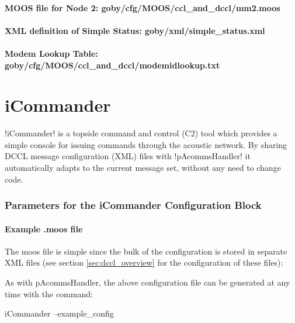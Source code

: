 \paragraph{MOOS file for Node 2: goby/cfg/MOOS/ccl\_and\_dccl/mm2.moos}
\resetbvlinenumber

\paragraph{XML definition of Simple Status: goby/xml/simple\_status.xml}
\resetbvlinenumber

\paragraph{Modem Lookup Table: goby/cfg/MOOS/ccl\_and\_dccl/modemidlookup.txt}
\resetbvlinenumber

\section{iCommander}\label{sec:icommander} 

!iCommander! is a topside command and control (C2) tool which provides a simple
console for issuing commands through the acoustic network. By sharing
DCCL message configuration (XML) files with !pAcommsHandler! it automatically adapts to the current message set,
without any need to change code.

\subsubsection{Parameters for the iCommander Configuration Block}
\paragraph{Example .moos file}
The moos file is simple since the bulk of the configuration is stored in separate XML files (see section \ref{sec:dccl_overview} for the configuration of these files):

\resetbvlinenumber
As with pAcommsHandler, the above configuration file can be generated at any time with the command:
\begin{boxedverbatim}
iCommander --example_config
\end{boxedverbatim}
\resetbvlinenumber



